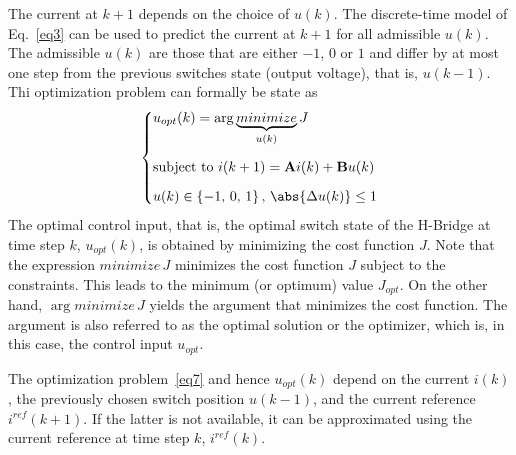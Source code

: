 \documentclass[12pt,a4paper,oneside]{book}
\begin{document}
\begin{onehalfspace}
The current at $k+1$ depends on the choice of $u(k)$. The discrete-time model 
of Eq.~\eqref{eq3} can be used to predict the current at $k+1$ for all 
admissible $u(k)$. The admissible $u(k)$ are those that are either $-1$, $0$ or 
$1$ and differ by at most one step from the previous switches state (output 
voltage), that is, $u(k-1)$. Thi optimization problem can formally be state as
\begin{equation}\label{eq7}
	\left\lbrace \begin{aligned}
		& u_{opt}(k) = \arg \underbrace{{minimize}}_{u(k)} J \\[6pt]
		& \text{subject to } i(k+1)=\mathbf{A}i(k)+\mathbf{B}u(k) \\[6pt]
		& u(k) \in \left\lbrace -1,\,0,\,1\right\rbrace,\, \abs{\Delta u(k)} 
		\le 1
	\end{aligned}\right. 
\end{equation}
The optimal control input, that is, the optimal switch state of the H-Bridge at 
time step $k$, $u_{opt}(k)$, is obtained by minimizing the cost function $J$. 
Note that the expression $minimize\,J$ minimizes the cost function $J$ subject 
to the constraints. This leads to the minimum (or optimum) value $J_{opt}$. On 
the other hand, $\arg minimize\,J$ yields the argument that minimizes the cost 
function. The argument is also referred to as the optimal solution or the 
optimizer, which is, in this case, the control input $u_{opt}$.

The optimization problem~\ref{eq7} and hence $u_{opt}(k)$ depend on the current 
$i(k)$, the previously chosen switch position $u(k-1)$, and the current 
reference $i^{ref}(k+1)$. If the latter is not available, it can be 
approximated using the current reference at time step $k$, $i^{ref}(k)$.

\end{onehalfspace}
\end{document}
